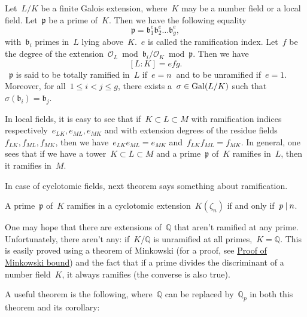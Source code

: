 \begin{proposition}
  Let~$L/K$ be a finite Galois extension, where~$K$ may be a number field or a local field. Let~$\mathfrak{p}$ be a prime of~$K$. Then we have the following equality
  \begin{equation}
    \mathfrak{p}=\mathfrak{b}_1^e \mathfrak{b}_2^e\ldots \mathfrak{b}_g^e, 
  \end{equation}
  with~$\mathfrak{b}_i$ primes in~$L$ lying above~$K$.~$e$ is called the ramification index. Let~$f$ be the degree of the extension~$\mathcal{O}_L \bmod \mathfrak{b}_i / \mathcal{O}_K \bmod \mathfrak{p}$. Then we have 
  \begin{equation}
    \left[L:K\right] = efg. 
  \end{equation}
 ~$\mathfrak{p}$ is said to be totally ramified in~$L$ if~$e =n~$ and to be unramified if~$e=1$. Moreover, for all~$1 \leq i<j \leq g$, there exists a~$\sigma \in \operatorname{Gal}(L/K)$ such that~$\sigma(\mathfrak{b}_i) = \mathfrak{b}_j$.
\end{proposition}


In local fields, it is easy to see that if~$K \subset L \subset M$ with ramification indices respectively~$e_{LK},e_{ML},e_{MK}$ and with extension degrees of the residue fields~$f_{LK},f_{ML},f_{MK}$, then we have~$e_{LK}e_{ML} = e_{MK}$ and~$f_{LK}f_{ML}=f_{MK}$. In general, one sees that if we have a tower~$K \subset L \subset M$ and a prime~$\mathfrak{p}$ of~$K$ ramifies in~$L$, then it ramifies in~$M$.

In case of cyclotomic fields, next theorem says something about ramification.

\begin{theorem}
  A prime~$\mathfrak{p}$ of~$K$ ramifies in a cyclotomic extension~$K(\zeta_n)$ if and only if~$p\mathbin{|} n$.
\end{theorem}

One may hope that there are extensions of~$\mathbb{Q}$ that aren't ramified at any prime. Unfortunately, there aren't any: if~$K/\mathbb{Q}$ is unramified at all primes,~$K = \mathbb{Q}$. This is easily proved using a theorem of Minkowski (for a proof, see \href{http://planetmath.org/encyclopedia/ProofOfMinkowskisBound.html}{Proof of Minkowski bound}) and the fact that if a prime divides the discriminant of a number field~$K$, it always ramifies (the converse is also true).

A useful theorem is the following, where~$\mathbb{Q}$ can be replaced by~$\mathbb{Q}_p$ in both this theorem and its corollary:

